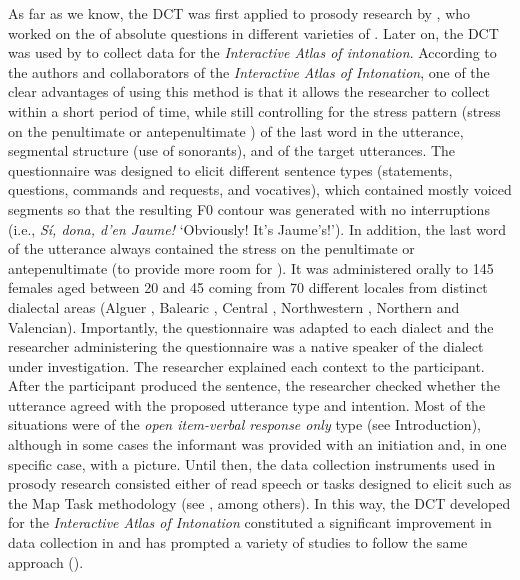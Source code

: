 \documentclass[output=paper]{LSP/langsci}
\begin{document}
As far as we know, the DCT was first applied to  prosody research by \citet{Prieto.2001}, who worked on the  of absolute questions in different varieties of . Later on, the DCT was used by \citet{Prieto2007-2012} to collect data for the \textit{Interactive Atlas of  intonation}. According to the authors and collaborators of the \textit{Interactive Atlas of  Intonation}, one of the clear advantages of using this method is that it allows the researcher to collect  within a short period of time, while still controlling for the stress pattern (stress on the penultimate or antepenultimate ) of the last word in the utterance, segmental structure (use of sonorants), and  of the target utterances. The questionnaire was designed to elicit different sentence types (statements, questions, commands and requests, and vocatives), which contained mostly voiced segments so that the resulting F0 contour was generated with no interruptions (i.e., \textit{Sí, dona, d’en Jaume!} ‘Obviously! It’s Jaume’s!’). In addition, the last word of the utterance always contained the stress on the penultimate or antepenultimate  (to provide more room for ). It was administered orally to 145 females aged between 20 and 45 coming from 70 different  locales from distinct dialectal areas (Alguer , Balearic , Central , Northwestern , Northern  and Valencian). Importantly, the questionnaire was adapted to each dialect and the researcher administering the questionnaire was a native speaker of the dialect under investigation. The researcher explained each context to the participant. After the participant produced the sentence, the researcher checked whether the utterance agreed with the proposed utterance type and intention. Most of the situations were of the \textit{open item-verbal response only} type (see Introduction), although in some cases the informant was provided with an  initiation and, in one specific case, with a picture. Until then, the data collection instruments used in  prosody research consisted either of read speech or tasks designed to elicit  such as the Map Task methodology (see \citealt{Grice2003}, among others). In this way, the DCT developed for the \textit{Interactive Atlas of  Intonation} constituted a significant improvement in data collection in  and has prompted a variety of studies to follow the same approach  (\citealt{Prieto2010,Brehm2014,frotaPrieto2015,Sichel-Bazin2015}). 
\end{document}

